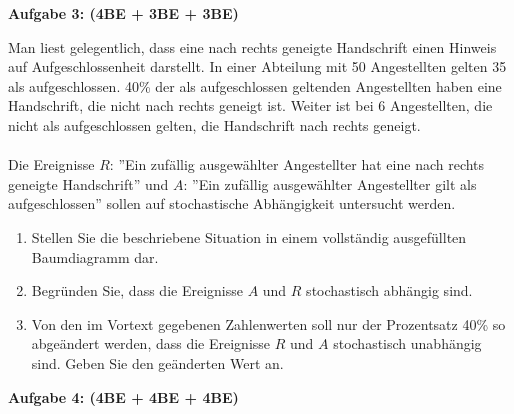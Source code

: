 \documentclass[a4paper,12pt]{article}
\newcommand{\Aufgabe}[1]{
  {
  \vspace*{0.5cm}
  \textsf{\textbf{Aufgabe #1}}
  \vspace*{0.2cm}
  
  }
}
\begin{document}
\vspace{2cm}







\Aufgabe{3: (4BE + 3BE + 3BE)}
Man liest gelegentlich, dass eine nach rechts geneigte Handschrift einen Hinweis auf Aufgeschlossenheit darstellt. In einer Abteilung mit 50 Angestellten gelten 35 als aufgeschlossen. 40\% der als aufgeschlossen geltenden Angestellten haben eine Handschrift, die nicht nach rechts geneigt ist. Weiter ist bei 6 Angestellten, die nicht als aufgeschlossen gelten, die Handschrift nach rechts geneigt.\\
\\
Die Ereignisse $R$: ''Ein zufällig ausgewählter Angestellter hat eine nach rechts geneigte Handschrift'' und $A$: ''Ein zufällig ausgewählter Angestellter gilt als aufgeschlossen'' sollen auf stochastische Abhängigkeit untersucht werden.

\begin{enumerate}[label={\alph*)}]
  \item Stellen Sie die beschriebene Situation in einem vollständig ausgefüllten Baumdiagramm dar.
  \item Begründen Sie, dass die Ereignisse $A$ und $R$ stochastisch abhängig sind. 
  \item Von den im Vortext gegebenen Zahlenwerten soll nur der Prozentsatz 40\% so abgeändert werden, dass die Ereignisse $R$ und $A$ stochastisch unabhängig sind. Geben Sie den geänderten Wert an.
\end{enumerate}


\vspace{2cm}

\Aufgabe{4: (4BE + 4BE + 4BE)}

\end{document}
